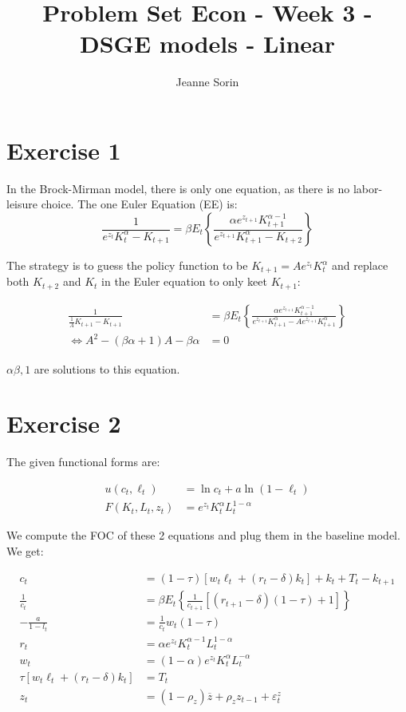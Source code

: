 \documentclass[11pt]{article}
\title{Problem Set Econ - Week 3 - DSGE models - Linear}
\author{Jeanne Sorin}
\numberwithin{equation}{section}
\theoremstyle{plain}
\theoremstyle{definition}
\def\bic{\Leftrightarrow}
\newcommand{\1}{\mathbbm 1}
\def\a{\alpha}
\def\b{\beta}
\newcommand{\e}{\varepsilon}
\begin{document}
\maketitle



\section*{Exercise 1}
In the Brock-Mirman model, there is only one equation, as there is no labor-leisure choice. The one Euler Equation (EE) is:
\begin{equation}
\frac{1}{e^{z_{t}} K_{t}^{\alpha}-K_{t+1}}=\beta E_{t}\left\{\frac{\alpha e^{z_{t+1}} K_{t+1}^{\alpha-1}}{e^{z_{t+1}} K_{t+1}^{\alpha}-K_{t+2}}\right\}
\end{equation}

\noindent The strategy is to guess the policy function to be $ K_{t+1}=A e^{z_{t}} K_{t}^{\alpha} $ and replace both $K_{t+2}$ and $K_{t}$ in the Euler equation to only keet $K_{t+1}$:

\begin{align}
\frac{1}{\frac{1}{A}K_{t+1}-K_{t+1}}&=\beta E_{t}\left\{\frac{\alpha e^{z_{t+1}} K_{t+1}^{\alpha-1}}{e^{z_{t+1}} K_{t+1}^{\alpha}-A e^{z_{t+1}} K_{t+1}^{\alpha}}\right\} \\
\bic A^2 - (\b \a + 1) A - \b \a &= 0
\end{align}

${\a \b, 1}$ are solutions to this equation.



\section*{Exercise 2}

The given functional forms are:

\begin{align} 
u\left(c_{t}, \ell_{t}\right) &=\ln c_{t}+a \ln \left(1-\ell_{t}\right) \\ 
F\left(K_{t}, L_{t}, z_{t}\right) &=e^{z_{t}} K_{t}^{\alpha} L_{t}^{1-\alpha} 
\end{align}

We compute the FOC of these 2 equations and plug them in the baseline model. We get:

\begin{align}
c_{t}&=(1-\tau)\left[w_{t} \ell_{t}+\left(r_{t}-\delta\right) k_{t}\right]+k_{t}+T_{t}-k_{t+1} \\
\frac{1}{c_t}&=\beta E_{t}\left\{\frac{1}{c_{t+1}}\left[\left(r_{t+1}-\delta\right)(1-\tau)+1\right]\right\} \\
-\frac{a}{1-l_t}&=\frac{1}{c_t} w_{t}(1-\tau) \\
r_{t}&=\a e^{z_{t}} K_{t}^{\alpha-1} L_{t}^{1-\alpha} \\
w_{t}&=(1 - \a) e^{z_{t}} K_{t}^{\alpha} L_{t}^{-\alpha} \\
\tau\left[w_{t} \ell_{t}+\left(r_{t}-\delta\right) k_{t}\right]&=T_{t}\\
z_t&= (1 - \rho_z) \overline{z} + \rho_z z_{t-1} + \e_t^{z}
\end{align}
\end{document}

